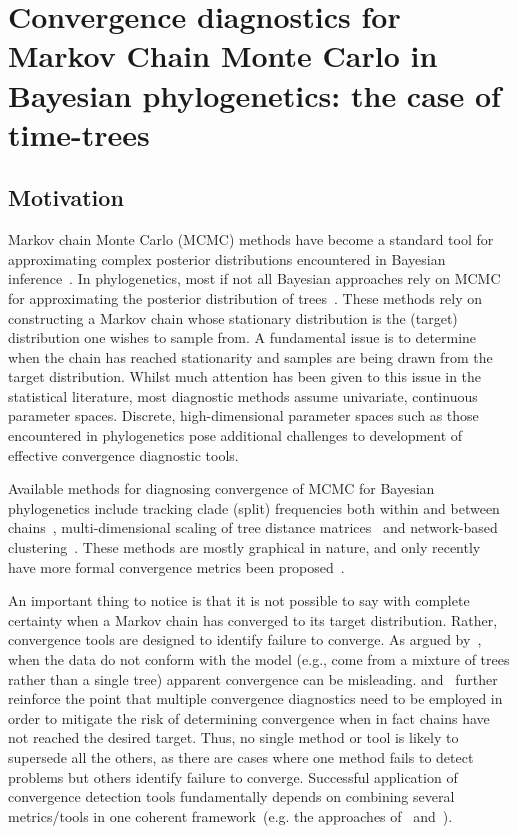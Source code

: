 \chapter{Convergence diagnostics for Markov Chain Monte Carlo in Bayesian phylogenetics: the case of time-trees}


\section{Motivation}
\label{sec:intro}

Markov chain Monte Carlo (MCMC) methods have become a standard tool for approximating complex posterior distributions encountered in Bayesian inference~\citep{Robert2011}.
In phylogenetics, most if not all Bayesian approaches rely on MCMC for approximating the posterior distribution of trees~\citep{Li2000,Suchard2001,Huelsenbeck2001b}.
These methods rely on constructing a Markov chain whose stationary distribution is the (target) distribution one wishes to sample from.
A fundamental issue is to determine when the chain has reached stationarity and samples are being drawn from the target distribution.
Whilst much attention has been given to this issue in the statistical literature, most diagnostic methods assume univariate, continuous parameter spaces.
Discrete, high-dimensional parameter spaces such as those encountered in phylogenetics pose additional challenges to development of effective convergence diagnostic tools.

Available methods for diagnosing convergence of MCMC for Bayesian phylogenetics include tracking clade (split) frequencies both within and between chains~\citep{Nylander2004}, multi-dimensional scaling of tree distance matrices~\cite{Hillis2005,Matsen2006} and network-based clustering~\citep{Whidden2015}. 
These methods are mostly graphical in nature, and only recently have more formal convergence metrics been proposed~\citep{Whidden2015,Lanfear2016}.

An important thing to notice is that it is not possible to say with complete certainty when a Markov chain has converged to its target distribution.
Rather, convergence tools are designed to identify failure to converge.
As argued by~\cite{Mossel2005}, when the data do not conform with the model (e.g., come from a mixture of trees rather than a single tree) apparent convergence can be misleading.
\cite{Cowles1996} and~\cite{Brooks1998} further reinforce the point that multiple convergence diagnostics need to be employed in order to mitigate the risk of determining convergence when in fact chains have not reached the desired target.
Thus, no single method or tool is likely to supersede all the others, as there are cases where one method fails to detect problems but others identify failure to converge. 
Successful application of convergence detection tools fundamentally depends on combining several metrics/tools in one coherent framework~(e.g. the approaches of~\cite{Nylander2004} and~\cite{Lanfear2016}).

